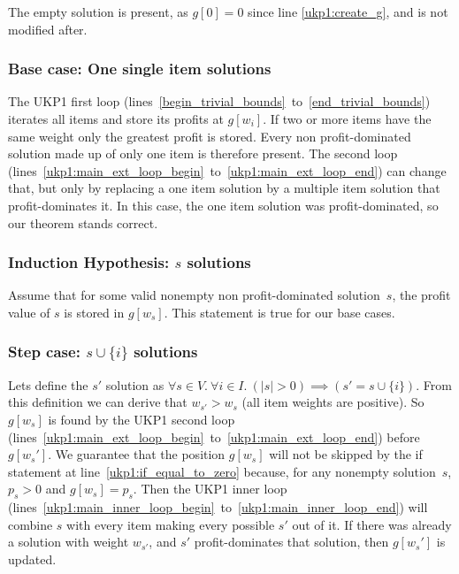 \documentclass[12pt]{article}
\begin{document}
The empty solution is present, as \(g[0] = 0\) since line \ref{ukp1:create_g}, and is not modified after.

\subsubsection{Base case: One single item solutions}
\label{ukp1:single_item_solution_proof}

The UKP1 first loop (lines~\ref{begin_trivial_bounds}~to~\ref{end_trivial_bounds}) iterates all items and store its profits at \(g[w_i]\). If two or more items have the same weight only the greatest profit is stored. Every non profit-dominated solution made up of only one item is therefore present. The second loop (lines~\ref{ukp1:main_ext_loop_begin}~to~\ref{ukp1:main_ext_loop_end}) can change that, but only by replacing a one item solution by a multiple item solution that profit-dominates it. In this case, the one item solution was profit-dominated, so our theorem stands correct.

\subsubsection{Induction Hypothesis: \(s\) solutions}

Assume that for some valid nonempty non profit-dominated solution~\(s\), the profit value of \(s\) is stored in \(g[w_s]\). This statement is true for our base cases.

\subsubsection{Step case: \(s \cup \{i\}\) solutions}
\label{ukp1:step_case_proof}

Lets define the \(s'\) solution as \(\forall s \in V.~\forall i \in I.~(|s| > 0) \implies (s' = s \cup \{i\})\). From this definition we can derive that \(w_{s'} > w_s\) (all item weights are positive). So \(g[w_s]\) is found by the UKP1 second loop (lines~\ref{ukp1:main_ext_loop_begin}~to~\ref{ukp1:main_ext_loop_end}) before \(g[w_s']\). We guarantee that the position \(g[w_s]\) will not be skipped by the if statement at line~\ref{ukp1:if_equal_to_zero} because, for any nonempty solution~\(s\), \(p_s > 0\) and \(g[w_s] = p_s\). Then the UKP1 inner loop (lines~\ref{ukp1:main_inner_loop_begin}~to~\ref{ukp1:main_inner_loop_end}) will combine \(s\) with every item making every possible \(s'\) out of it. If there was already a solution with weight \(w_{s'}\), and \(s'\) profit-dominates that solution, then \(g[w_s']\) is updated.
\end{document}
